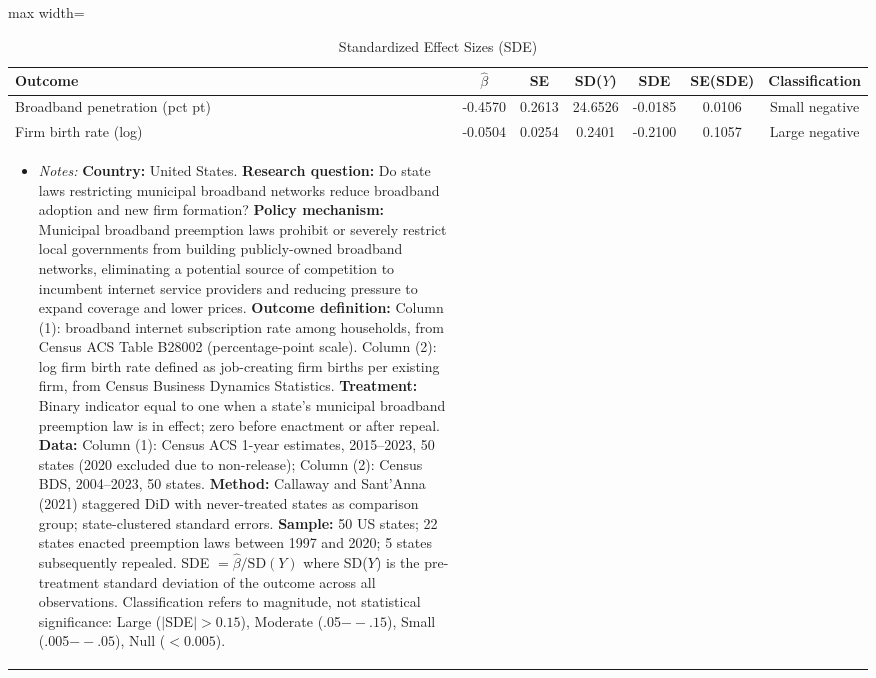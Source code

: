 \begin{table}[htbp]
\centering
\caption{Standardized Effect Sizes (SDE)}
\label{tab:sde}
\begin{adjustbox}{max width=\textwidth}\small\begin{tabular}{lcccccc}
\hline\hline
Outcome & $\hat{\beta}$ & SE & SD($Y$) & SDE & SE(SDE) & Classification \\
\hline
Broadband penetration (pct pt) & -0.4570 & 0.2613 & 24.6526 & -0.0185 & 0.0106 & Small negative \\
Firm birth rate (log) & -0.0504 & 0.0254 & 0.2401 & -0.2100 & 0.1057 & Large negative \\
\hline
\begin{minipage}{\linewidth}\vspace{2pt}\begin{itemize}[leftmargin=*,noitemsep]
\item \textit{Notes:} \textbf{Country:} United States. \textbf{Research question:} Do state laws restricting municipal broadband networks reduce broadband adoption and new firm formation? \textbf{Policy mechanism:} Municipal broadband preemption laws prohibit or severely restrict local governments from building publicly-owned broadband networks, eliminating a potential source of competition to incumbent internet service providers and reducing pressure to expand coverage and lower prices. \textbf{Outcome definition:} Column (1): broadband internet subscription rate among households, from Census ACS Table B28002 (percentage-point scale). Column (2): log firm birth rate defined as job-creating firm births per existing firm, from Census Business Dynamics Statistics. \textbf{Treatment:} Binary indicator equal to one when a state's municipal broadband preemption law is in effect; zero before enactment or after repeal. \textbf{Data:} Column (1): Census ACS 1-year estimates, 2015--2023, 50 states (2020 excluded due to non-release); Column (2): Census BDS, 2004--2023, 50 states. \textbf{Method:} Callaway and Sant'Anna (2021) staggered DiD with never-treated states as comparison group; state-clustered standard errors. \textbf{Sample:} 50 US states; 22 states enacted preemption laws between 1997 and 2020; 5 states subsequently repealed. SDE $= \hat{\beta} / \text{SD}(Y)$ where SD($Y$) is the pre-treatment standard deviation of the outcome across all observations. Classification refers to magnitude, not statistical significance: Large ($|$SDE$| > 0.15$), Moderate (.05$--.15$), Small (.005$--.05$), Null ($< 0.005$).
\end{itemize}\end{minipage}\\
\end{tabular}\end{adjustbox}
\end{table}

